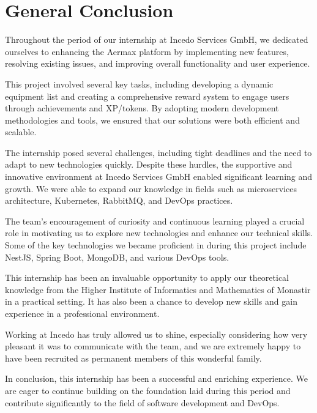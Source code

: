 \thispagestyle{plain} %
\section*{General Conclusion}

Throughout the period of our internship at Incedo Services GmbH, we dedicated ourselves to enhancing the Aermax platform by implementing new features, resolving existing issues, and improving overall functionality and user experience.

This project involved several key tasks, including developing a dynamic equipment list and creating a comprehensive reward system to engage users through achievements and XP/tokens. By adopting modern development methodologies and tools, we ensured that our solutions were both efficient and scalable.

The internship posed several challenges, including tight deadlines and the need to adapt to new technologies quickly. Despite these hurdles, the supportive and innovative environment at Incedo Services GmbH enabled significant learning and growth. We were able to expand our knowledge in fields such as microservices architecture, Kubernetes, RabbitMQ, and DevOps practices.

The team's encouragement of curiosity and continuous learning played a crucial role in motivating us to explore new technologies and enhance our technical skills. Some of the key technologies we became proficient in during this project include NestJS, Spring Boot, MongoDB, and various DevOps tools.

This internship has been an invaluable opportunity to apply our theoretical knowledge from the Higher Institute of Informatics and Mathematics of Monastir in a practical setting. It has also been a chance to develop new skills and gain experience in a professional environment. 

Working at Incedo has truly allowed us to shine, especially considering how very pleasant it was to communicate with the team, and we are extremely happy to have been recruited as permanent members of this wonderful family.

In conclusion, this internship has been a successful and enriching experience. We are eager to continue building on the foundation laid during this period and contribute significantly to the field of software development and DevOps.




